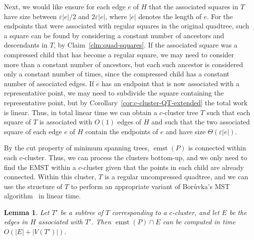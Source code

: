 \documentclass[11pt]{paper}
\newcommand {\eps} {\varepsilon}
\newcommand {\boruvka}{Bor\r{u}vka}
\DeclareMathOperator {\emst}{emst}
\newtheorem {lem}[theorem] {Lemma}
\begin{document}
  Next, we would like ensure for each edge $e$ of $H$ that the associated
  squares in $T$ have size between $\eps|e|/2$ and $2\eps|e|$, where
  $|e|$ denotes the length of $e$. 
  For the endpoints that were associated with regular squares in the
  original quadtree, such a square can be found by considering a constant 
  number of ancestors and descendants in $T$, by 
  Claim~\ref{clm:quad-squares}.  If the associated square was a compressed
  child that has become a regular square, we may need to consider more than
  a constant number of ancestors, but each such ancestor is considered only
  a constant number of times, since the compressed child has a 
  constant number of associated edges. If $e$ has an endpoint 
  that is now associated with a representative point, we may need to subdivide
  the square containing the representative point, but by 
  Corollary~\ref{cor:c-cluster-QT-extended} the total work is linear.
  Thus, in total linear time we can obtain a $c$-cluster
  tree $T$ such that each square of $T$ is associated with $O(1)$
  edges of $H$ and such that the two associated square of each 
  edge $e$ of $H$  contain the endpoints of $e$ and have size
  $\Theta(\eps|e|)$. 

  By the cut property of minimum spanning trees,
  $\emst(P)$ is connected within each $c$-cluster. Thus, we can process
  the clusters bottom-up, and we
  only need to find the EMST within a $c$-cluster given
  that the points in each child are already connected. 
  Within this cluster, $T$ is a regular uncompressed quadtree,
  and we can use the structure of $T$ to perform an appropriate
  variant of \boruvka's MST algorithm~\cite{Boruvka26,Tarjan83} in linear time.

  \begin{lem}\label{lem:extract-emst}
    Let $T'$ be a subtree of $T$ corresponding to a $c$-cluster, and
    let $E$ be the edges in $H$ associated with $T'$.
    Then $\emst(P) \cap E$ can be computed in time $O(|E| + |V(T')|)$.
  \end{lem}
\end{document}
